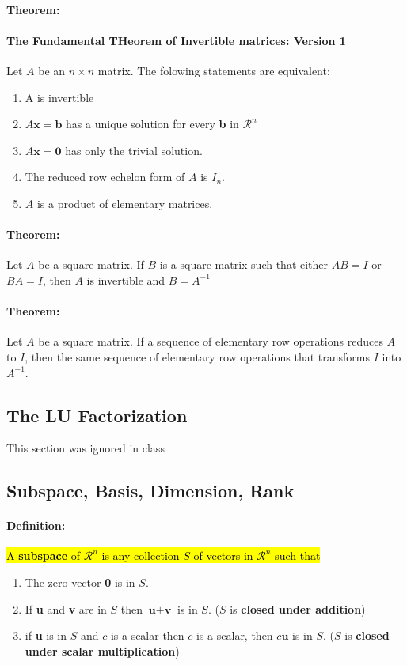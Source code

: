 \documentclass[12pt]{article}
\newenvironment{theorem}{\paragraph{Theorem:\hfill}}{\hfill}
\newenvironment{definition}{\paragraph{Definition: }}{\hfill}
\begin{document}
\begin{theorem}
	\paragraph{The Fundamental THeorem of Invertible matrices: Version 1}
	
	Let $A$ be an $n \times n$ matrix. The folowing statements are equivalent:
	
	\begin{enumerate}
		\item A is invertible
		\item $A \textbf{x} = \textbf{b}$ has a unique solution for every \textbf{b} in $\mathcal{R}^n$
		\item $A \textbf{x} = \textbf{0}$ has only the trivial solution.
		\item The reduced row echelon  form of $A$ is $I_n$.
		\item $A$ is a product of elementary matrices.
	\end{enumerate}
\end{theorem}

\begin{theorem}
	Let $A$ be a square matrix. If $B$ is a square matrix such that either $AB = I$ or $BA = I$, then $A$ is invertible and $B = A^{-1}$
\end{theorem}

\begin{theorem}
	Let $A$ be a square matrix. If a sequence of elementary row operations reduces $A$ to $I$, then the same sequence of elementary row operations that transforms $I$ into $A^{-1}$.
\end{theorem}

\subsection{The LU Factorization}
This section was ignored in class

\subsection{Subspace, Basis, Dimension, Rank}

\begin{definition}
	\hl{A \textbf{subspace} of $\mathcal{R}^n$ is any collection $S$ of vectors in $\mathcal{R}^n$ such that}
	\begin{enumerate}
		\item The zero vector \textbf{0} is in $S$.
		\item If \textbf{u} and \textbf{v} are in $S$ then $\textbf{u} + \textbf{v}$ is in $S$. ($S$ is \textbf{closed under addition})
		\item if \textbf{u} is in $S$ and $c$ is a scalar then $c$ is a scalar, then $c\textbf{u}$ is in $S$. ($S$ is \textbf{closed under scalar multiplication})
	\end{enumerate}
\end{definition}
\end{document}

